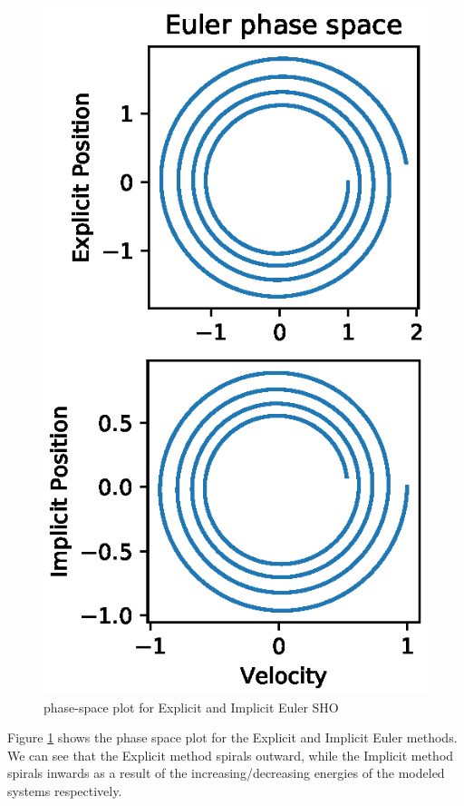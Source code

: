 \documentclass{article}
\begin{document}
\begin{figure}[h!]
\centering
\includegraphics[scale=0.75]{fig/exp_imp_phase.eps}
\caption{phase-space plot for Explicit and Implicit Euler SHO}
\label{fig:exp_imp_phase}
\end{figure}

Figure \ref{fig:exp_imp_phase} shows the phase space plot for the Explicit and Implicit Euler methods.  We can see that the Explicit method spirals outward, while the Implicit method spirals inwards as a result of the increasing/decreasing energies of the modeled systems respectively.  
\end{document}
